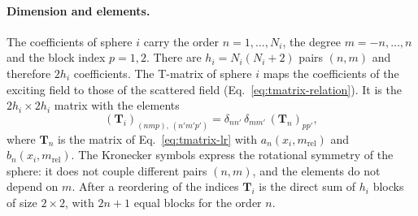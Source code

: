 \documentclass[11pt,a4paper]{article}
\begin{document}
\paragraph{Dimension and elements.}
The coefficients of sphere $i$ carry the order $n = 1, \dots, N_i$, the degree $m = -n, \dots, n$ and the block index $p = 1, 2$.
There are $h_i = N_i(N_i+2)$ pairs $(n, m)$ and therefore $2h_i$ coefficients.
The T-matrix of sphere $i$ maps the coefficients of the exciting field to those of the scattered field (Eq.~\eqref{eq:tmatrix-relation}).
It is the $2h_i \times 2h_i$ matrix with the elements
\begin{equation}
  \left(\mathbf{T}_i\right)_{(n m p),\,(n' m' p')} = \delta_{nn'}\,\delta_{mm'}\,\left(\mathbf{T}_n\right)_{pp'},
  \label{eq:tmatrix-elements}
\end{equation}
where $\mathbf{T}_n$ is the matrix of Eq.~\eqref{eq:tmatrix-lr} with $a_n(x_i, m_\mathrm{rel})$ and $b_n(x_i, m_\mathrm{rel})$.
The Kronecker symbols express the rotational symmetry of the sphere: it does not couple different pairs $(n, m)$, and the elements do not depend on $m$.
After a reordering of the indices $\mathbf{T}_i$ is the direct sum of $h_i$ blocks of size $2 \times 2$, with $2n+1$ equal blocks for the order $n$.
\end{document}
